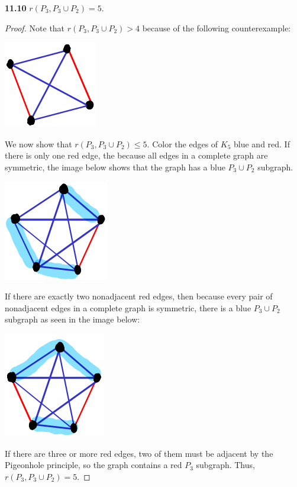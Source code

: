 \documentclass[12pt]{article}
\begin{document}
\newpage\noindent\textbf{11.10} $r(P_3, P_3 \cup P_2) = 5$.
\begin{proof}
    Note that $r(P_3, P_3 \cup P_2) > 4$ because of the following counterexample:
    \begin{center} \includegraphics{5.png} \end{center}
    We now show that $r(P_3, P_3 \cup P_2) \leq 5$.
    Color the edges of $K_5$ blue and red.
    If there is only one red edge, the because all edges in a complete graph are symmetric, the image below shows that the graph has a blue $P_3\cup P_2$ subgraph.
    \begin{center} \includegraphics{6.png} \end{center}
    If there are exactly two nonadjacent red edges, then because every pair of nonadjacent edges in a complete graph is symmetric, there is a blue $P_3\cup P_2$ subgraph as seen in the image below:
    \begin{center} \includegraphics{7.png} \end{center}
    If there are three or more red edges, two of them must be adjacent by the Pigeonhole principle, so the graph contains a red $P_3$ subgraph.
    Thus, $r(P_3, P_3 \cup P_2) = 5$.
\end{proof}
\end{document}
